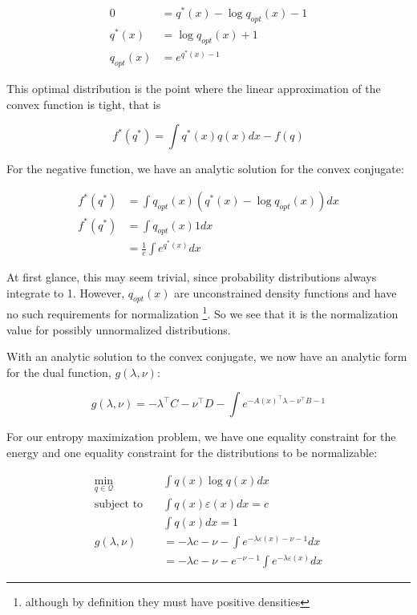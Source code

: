 \documentclass[a4paper]{article}
\begin{document}
\begin{equation}
  \begin{split}
    0 &= q^*(x) - \log q_{opt}(x) - 1 \\
    q^*(x) &= \log q_{opt}(x) + 1 \\
    q_{opt}(x) &= e^{ q^*(x) - 1 }
  \end{split}
  \label{}
\end{equation}

This optimal distribution is the point where the linear approximation of the convex function is tight, that is

\begin{equation}
  f^*(q^*) = \int q^*(x) q(x) dx - f(q)
  \label{Fermat's equality}
\end{equation}

For the negative function, we have an analytic solution for the convex conjugate:

\begin{equation}
  \begin{split}
    f^*(q^*) &= \int q_{opt}(x) \left(  q^*(x) - \log q_{opt}(x) \right) dx \\
    f^*(q^*) &= \int q_{opt}(x) 1 dx \\
    &= \frac{1}{e} \int e^{ q^*(x) } dx
  \end{split}
  \label{}
\end{equation}

At first glance, this may seem trivial, since probability distributions always integrate to 1.  However, $q_{opt}(x)$ are unconstrained density functions and have no such requirements for normalization \footnote{although by definition they must have positive densities}.  So we see that it is the normalization value for possibly unnormalized distributions.

With an analytic solution to the convex conjugate, we now have an analytic form for the dual function, $g(\lambda, \nu)$:

\begin{equation}
  g(\lambda,\nu) = - \lambda^\intercal C - \nu^\intercal D - \int e^{ - A(x)^\intercal \lambda - \nu^\intercal B - 1}
  \label{}
\end{equation}

For our entropy maximization problem, we have one equality constraint for the energy and one equality constraint for the distributions to be normalizable:

\begin{equation}
  \begin{split}
    \min_{q \in \mathcal{Q} } \quad & \int q(x) \log q(x) dx \\
    \text{subject to} \quad & \int q(x) \varepsilon(x) dx = c \\
    \quad & \int q(x) dx = 1 \\
    g(\lambda, \nu) &= - \lambda c - \nu - \int e^{ - \lambda \varepsilon(x) - \nu - 1 } dx \\
    & = -\lambda c - \nu - e^{ - \nu - 1} \int e^{ - \lambda \varepsilon(x) } dx
  \end{split}
  \label{}
\end{equation}
\end{document}

